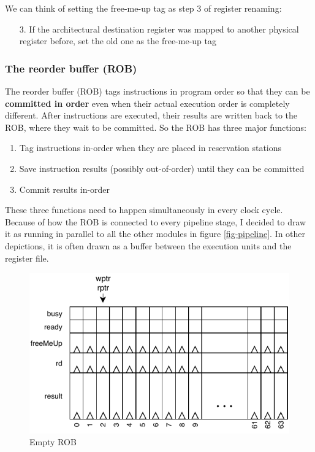 \documentclass[12pt,a4paper]{article} %
\begin{document}
We can think of setting the free-me-up tag as step 3 of register renaming:
\begin{enumerate}
	\item[3.] If the architectural destination register was mapped to another physical register before, set the old one as the free-me-up tag
\end{enumerate}


\newpage 
\subsubsection{The reorder buffer (ROB)} \label{sec-ROB}
The reorder buffer (ROB) tags instructions in program order so that they can be \textbf{committed in order} even when their actual execution order is completely different. After instructions are executed, their results are written back to the ROB, where they wait to be committed. So the ROB has three major functions:
\begin{enumerate}
	\item Tag instructions in-order when they are placed in reservation stations
	\item Save instruction results (possibly out-of-order) until they can be committed
	\item Commit results in-order
\end{enumerate}
These three functions need to happen simultaneously in every clock cycle. Because of how the ROB is connected to every pipeline stage, I decided to draw it as running in parallel to all the other modules in figure \ref{fig-pipeline}. In other depictions, it is often drawn as a buffer between the execution units and the register file.
\begin{figure}[H]
	\includegraphics[width=\textwidth]{Source/ROB/ROB-Empty.pdf}
	\caption{Empty ROB}%
	\label{empty}
\end{figure}%
\end{document}
